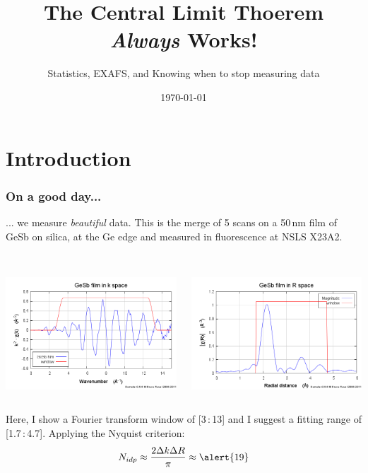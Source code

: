 \documentclass[10pt, xcolor=x11names, compress]{beamer}
\title{The Central Limit Thoerem \textit{Always} Works!}%
\subtitle{Statistics, EXAFS, and Knowing when to stop measuring data}
\date{\today}
\begin{document}
\maketitle


\section{Introduction}

\begin{frame}
  \frametitle{On a good day...} 

  \small
  ... we measure {\color{Green4}\textit{beautiful}} data.  This is
  the merge of 5 scans on a 50\,nm film of GeSb on silica, at the Ge
  edge and measured in fluorescence at NSLS X23A2.\\~

  \begin{columns}
    \begin{column}{0.5\linewidth}
      \begin{center}
        \includegraphics[width=0.8\linewidth]{../ATEA/info/gesb_chik.png}
      \end{center}
    \end{column}
    \begin{column}{0.5\linewidth}
      \begin{center}
        \includegraphics[width=0.8\linewidth]{../ATEA/info/gesb_chir.png}
      \end{center}
    \end{column}
  \end{columns}
  Here, I show a Fourier transform window of [3\,:\,13] and I suggest a
  fitting range of [1.7\,:\,4.7].  Applying the Nyquist criterion:
  \begin{equation}
    \notag N_{idp} \approx \frac{2\Delta k\Delta R}{\pi} \approx \alert{19}
  \end{equation}


\end{frame}
\end{document}
